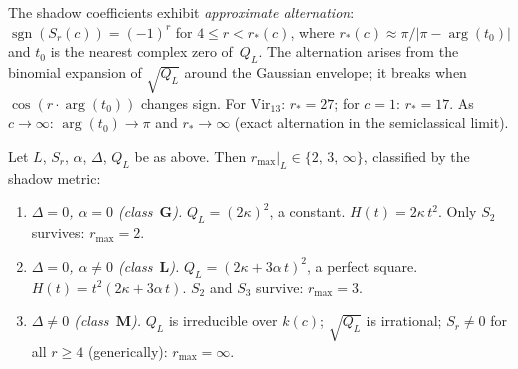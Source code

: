 \begin{remark}
\label{prop:alternating-signs}
The shadow coefficients exhibit \emph{approximate alternation}:
$\operatorname{sgn}(S_r(c)) = (-1)^r$ for
$4 \leq r < r_*(c)$, where
$r_*(c) \approx \pi/|\pi - \arg(t_0)|$
and $t_0$ is the nearest complex zero of~$Q_L$.
The alternation arises from the binomial expansion of
$\sqrt{Q_L}$ around the Gaussian envelope; it breaks when
$\cos(r \cdot \arg(t_0))$ changes sign.
For $\mathrm{Vir}_{13}$: $r_* = 27$;
for $c = 1$: $r_* = 17$.
As $c \to \infty$: $\arg(t_0) \to \pi$ and
$r_* \to \infty$ (exact alternation in the semiclassical limit).
\end{remark}

\begin{theorem}
\label{thm:single-line-dichotomy}
Let $L$, $S_r$, $\alpha$, $\Delta$, $Q_L$ be as above.
Then $r_{\max}|_L \in \{2,\,3,\,\infty\}$, classified by the
shadow metric:
\begin{enumerate}[label=\textup{(\roman*)}]
\item \emph{$\Delta = 0$, $\alpha = 0$
  \textup{(}class~$\mathbf{G}$\textup{)}.}\enspace
  $Q_L = (2\kappa)^2$, a constant.
  $H(t) = 2\kappa\,t^2$.  Only $S_2$ survives: $r_{\max} = 2$.

\item \emph{$\Delta = 0$, $\alpha \neq 0$
  \textup{(}class~$\mathbf{L}$\textup{)}.}\enspace
  $Q_L = (2\kappa + 3\alpha\,t)^2$, a perfect square.
  $H(t) = t^2(2\kappa + 3\alpha\,t)$.
  $S_2$ and $S_3$ survive: $r_{\max} = 3$.

\item \emph{$\Delta \neq 0$
  \textup{(}class~$\mathbf{M}$\textup{)}.}\enspace
  $Q_L$ is irreducible over $k(c)$; $\sqrt{Q_L}$ is irrational;
  $S_r \neq 0$ for all $r \geq 4$ (generically):
  $r_{\max} = \infty$.
\end{enumerate}


\end{theorem}
